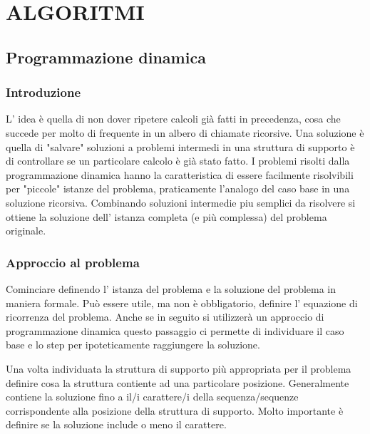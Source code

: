 \documentclass[11pt]{article}
\author{Aurelio}
\date{\today}
\title{}
\begin{document}
\setcounter{tocdepth}{10}
\tableofcontents


\section{ALGORITMI}
\label{sec:org46a9a9f}

\subsection{Programmazione dinamica}
\label{sec:org9ffb2d3}

\subsubsection{Introduzione}
\label{sec:orgd3ed79b}

L' idea è quella di non dover ripetere calcoli già fatti in precedenza, cosa che succede per 
molto di frequente in un albero di chiamate ricorsive.
Una soluzione è quella di "salvare" soluzioni a problemi intermedi in una struttura di supporto
è di controllare se un particolare calcolo è già stato fatto.
I problemi risolti dalla programmazione dinamica hanno la caratteristica di essere facilmente
risolvibili per "piccole" istanze del problema, praticamente l'analogo del caso base in una soluzione ricorsiva.
Combinando soluzioni intermedie piu semplici da risolvere si ottiene la soluzione dell' istanza completa (e più complessa)
del problema originale.


\subsubsection{Approccio al problema}
\label{sec:org192d00a}

Cominciare definendo l' istanza del problema e la soluzione del problema in maniera formale.
Può essere utile, ma non è obbligatorio, definire l' equazione di ricorrenza del problema.
Anche se in seguito si utilizzerà un approccio di programmazione dinamica questo passaggio ci permette di 
individuare il caso base e lo step per ipoteticamente raggiungere la soluzione.

Una volta individuata la struttura di supporto più appropriata per il problema definire cosa
la struttura contiente ad una particolare posizione.
Generalmente contiene la soluzione fino a il/i carattere/i della sequenza/sequenze corrispondente alla
posizione della struttura di supporto. Molto importante è definire se la soluzione include o meno il carattere.
\end{document}
